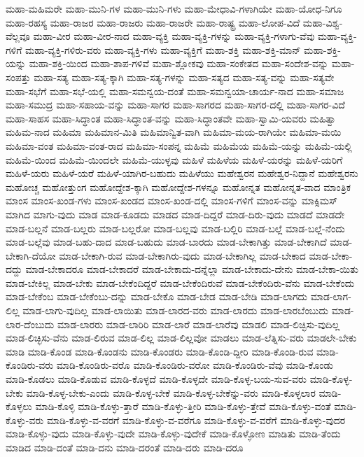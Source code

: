 {ಮಹಾ-ಮಹಿಮರೇ
ಮಹಾ-ಮುನಿ-ಗಳ
ಮಹಾ-ಮುನಿ-ಗಳು
ಮಹಾ-ಮೇಧಾವಿ-ಗಳಾಗಿಯೇ
ಮಹಾ-ಯೋಧ-ನಿಗೂ
ಮಹಾ-ರಹಸ್ಯ
ಮಹಾ-ರಾಜರ
ಮಹಾ-ರಾಜರು
ಮಹಾ-ರಾಜರೇ
ಮಹಾ-ರಾಷ್ಟ್ರ
ಮಹಾ-ಲೋಪ-ವಿದೆ
ಮಹಾ-ವಿಶ್ವ-ವೆಲ್ಲವೂ
ಮಹಾ-ವೀರ
ಮಹಾ-ವೀರ-ನಾದ
ಮಹಾ-ವ್ಯಕ್ತಿ
ಮಹಾ-ವ್ಯಕ್ತಿ-ಗಳನ್ನು
ಮಹಾ-ವ್ಯಕ್ತಿ-ಗಳಾಗು-ವೆವು
ಮಹಾ-ವ್ಯಕ್ತಿ-ಗಳಿಗೆ
ಮಹಾ-ವ್ಯಕ್ತಿ-ಗಳಿರು-ವರು
ಮಹಾ-ವ್ಯಕ್ತಿ-ಗಳು
ಮಹಾ-ವ್ಯಕ್ತಿಗೆ
ಮಹಾ-ಶಕ್ತಿ
ಮಹಾ-ಶಕ್ತಿ-ಮಾನ್
ಮಹಾ-ಶಕ್ತಿ-ಯನ್ನು
ಮಹಾ-ಶಕ್ತಿ-ಯಿಂದ
ಮಹಾ-ಶಾಪ-ಗಳಿವೆ
ಮಹಾ-ಶ್ಲೋಕವು
ಮಹಾ-ಸಂಕೇತದ
ಮಹಾ-ಸಂದೇಶ-ವನ್ನು
ಮಹಾ-ಸಂಪತ್ತು
ಮಹಾ-ಸತ್ಯ
ಮಹಾ-ಸತ್ಯ-ಕ್ಕಾಗಿ
ಮಹಾ-ಸತ್ಯ-ಗಳನ್ನು
ಮಹಾ-ಸತ್ಯದ
ಮಹಾ-ಸತ್ಯ-ವನ್ನು
ಮಹಾ-ಸತ್ಯವೇ
ಮಹಾ-ಸಭೆಗೆ
ಮಹಾ-ಸಭೆ-ಯಲ್ಲಿ
ಮಹಾ-ಸಮನ್ವಯ-ದಂತೆ
ಮಹಾ-ಸಮನ್ವಯಾ-ಚಾರ್ಯ-ನಾದ
ಮಹಾ-ಸಮಾಜ
ಮಹಾ-ಸಮುದ್ರ
ಮಹಾ-ಸಹಾಯ-ವನ್ನು
ಮಹಾ-ಸಾಗರ
ಮಹಾ-ಸಾಗರದ
ಮಹಾ-ಸಾಗರ-ದಲ್ಲಿ
ಮಹಾ-ಸಾಗರ-ವಿದೆ
ಮಹಾ-ಸಾಹಸ
ಮಹಾ-ಸಿದ್ಧಾಂತ
ಮಹಾ-ಸಿದ್ಧಾಂತ-ವನ್ನು
ಮಹಾ-ಸಿದ್ಧಾಂತವೇ
ಮಹಾ-ಸ್ವಾಮಿ-ಯವರು
ಮಹಿತ್ವಾ
ಮಹಿಮ-ನಾದ
ಮಹಿಮಾ
ಮಹಿಮಾನ-ಮಿತಿ
ಮಹಿಮಾನ್ವಿತ-ವಾಗಿ
ಮಹಿಮಾ-ಮಯ-ರಾಗಿಯೇ
ಮಹಿಮಾ-ಮಯಿ
ಮಹಿಮಾ-ವಂತ
ಮಹಿಮಾ-ವಂತ-ರಾದ
ಮಹಿಮಾ-ಸಂಪನ್ನ
ಮಹಿಮೆ
ಮಹಿಮೆಯ
ಮಹಿಮೆ-ಯನ್ನು
ಮಹಿಮೆ-ಯಲ್ಲಿ
ಮಹಿಮೆ-ಯಿಂದ
ಮಹಿಮೆ-ಯಿಂದಲೇ
ಮಹಿಮೆ-ಯುಳ್ಳವು
ಮಹಿಳೆ
ಮಹಿಳೆಯ
ಮಹಿಳೆ-ಯರನ್ನು
ಮಹಿಳೆ-ಯರಿಗೆ
ಮಹಿಳೆ-ಯರು
ಮಹಿಳೆ-ಯರೆ
ಮಹಿಳೆ-ಯಾಗಿರ-ಬಹುದು
ಮಹಿಳೆಯು
ಮಹೇಶ್ವರನ
ಮಹೇಶ್ವರ-ನಿದ್ದಾನೆ
ಮಹೇಶ್ವರನು
ಮಹೋಚ್ಚ
ಮಹೋತ್ತುಂಗ
ಮಹೋದ್ದೇಶ-ಕ್ಕಾಗಿ
ಮಹೋದ್ದೇಶ-ಗಳನ್ನೂ
ಮಹೋನ್ನತ
ಮಹೋನ್ನತ-ವಾದ
ಮಾಂತ್ರಿಕ
ಮಾಂಸ
ಮಾಂಸ-ಖಂಡ-ಗಳು
ಮಾಂಸ-ಖಂಡದ
ಮಾಂಸ-ಖಂಡ-ದಲ್ಲಿ
ಮಾಂಸ-ಗಳಿಗೆ
ಮಾಂಸ-ವನ್ನು
ಮಾಕ್ಸಿಮಸ್
ಮಾಗಿದ
ಮಾಗು-ವುದು
ಮಾಡ
ಮಾಡ-ಕೂಡದು
ಮಾಡದ
ಮಾಡ-ದಿದ್ದರೆ
ಮಾಡ-ದಿರು-ವುದು
ಮಾಡದೆ
ಮಾಡದೇ
ಮಾಡ-ಬಲ್ಲನೆ
ಮಾಡ-ಬಲ್ಲರು
ಮಾಡ-ಬಲ್ಲರೋ
ಮಾಡ-ಬಲ್ಲವು
ಮಾಡ-ಬಲ್ಲಿರಿ
ಮಾಡ-ಬಲ್ಲೆ
ಮಾಡ-ಬಲ್ಲೆ-ನೆಂದು
ಮಾಡ-ಬಲ್ಲೆವು
ಮಾಡ-ಬಹು-ದಾದ
ಮಾಡ-ಬಹುದು
ಮಾಡ-ಬಾರದು
ಮಾಡ-ಬೇಕಾಗಿತ್ತು
ಮಾಡ-ಬೇಕಾಗಿದೆ
ಮಾಡ-ಬೇಕಾಗಿ-ದೆಯೋ
ಮಾಡ-ಬೇಕಾಗಿ-ರುವ
ಮಾಡ-ಬೇಕಾಗಿರು-ವುದು
ಮಾಡ-ಬೇಕಾಗಿಲ್ಲ
ಮಾಡ-ಬೇಕಾದ
ಮಾಡ-ಬೇಕಾ-ದದ್ದು
ಮಾಡ-ಬೇಕಾದರೂ
ಮಾಡ-ಬೇಕಾದರೆ
ಮಾಡ-ಬೇಕಾದು-ದನ್ನೆಲ್ಲಾ
ಮಾಡ-ಬೇಕಾದು-ದೇನು
ಮಾಡ-ಬೇಕಾ-ಯಿತು
ಮಾಡ-ಬೇಕಿಲ್ಲ
ಮಾಡ-ಬೇಕು
ಮಾಡ-ಬೇಕೆಂದಿದ್ದರೆ
ಮಾಡ-ಬೇಕೆಂದಿರುವೆ
ಮಾಡ-ಬೇಕೆಂದಿರು-ವೆನು
ಮಾಡ-ಬೇಕೆಂದು
ಮಾಡ-ಬೇಕೆಂಬ
ಮಾಡ-ಬೇಕೆಂಬು-ದನ್ನು
ಮಾಡ-ಬೇಕೊ
ಮಾಡ-ಬೇಡ
ಮಾಡ-ಬೇಡಿ
ಮಾಡ-ಲಾಗದು
ಮಾಡ-ಲಾಗ-ಲಿಲ್ಲ
ಮಾಡ-ಲಾಗು-ವುದಿಲ್ಲ
ಮಾಡ-ಲಾಯಿತು
ಮಾಡ-ಲಾರದ-ವರು
ಮಾಡ-ಲಾರದು
ಮಾಡ-ಲಾರಬೆಂಬುದು
ಮಾಡ-ಲಾರ-ದೆಂಬುದು
ಮಾಡ-ಲಾರರು
ಮಾಡ-ಲಾರಿರಿ
ಮಾಡ-ಲಾರೆ
ಮಾಡ-ಲಾರೆವು
ಮಾಡಲಿ
ಮಾಡ-ಲಿಚ್ಛಿಸು-ವುದಿಲ್ಲ
ಮಾಡ-ಲಿಚ್ಛಿಸು-ವೆನು
ಮಾಡ-ಲಿರುವ
ಮಾಡ-ಲಿಲ್ಲ
ಮಾಡ-ಲಿಲ್ಲವೋ
ಮಾಡಲು
ಮಾಡ-ಲೆತ್ನಿಸು-ವರು
ಮಾಡಲೇ-ಬೇಕು
ಮಾಡಿ
ಮಾಡಿ-ಕೊಂಡ
ಮಾಡಿ-ಕೊಂಡನು
ಮಾಡಿ-ಕೊಂಡರು
ಮಾಡಿ-ಕೊಂಡಿ-ದ್ದೀರಿ
ಮಾಡಿ-ಕೊಂಡಿ-ರುವ
ಮಾಡಿ-ಕೊಂಡಿರು-ವರು
ಮಾಡಿ-ಕೊಂಡಿರು-ವರೊ
ಮಾಡಿ-ಕೊಂಡಿರು-ವರೋ
ಮಾಡಿ-ಕೊಂಡಿರು-ವೆವು
ಮಾಡಿ-ಕೊಂಡು
ಮಾಡಿ-ಕೊಡಲು
ಮಾಡಿ-ಕೊಡುವ
ಮಾಡಿ-ಕೊಳ್ಳದೆ
ಮಾಡಿ-ಕೊಳ್ಳದೇ
ಮಾಡಿ-ಕೊಳ್ಳ-ಬಯ-ಸುವ-ವರು
ಮಾಡಿ-ಕೊಳ್ಳ-ಬೇಕು
ಮಾಡಿ-ಕೊಳ್ಳ-ಬೇಕು-ಎಂದು
ಮಾಡಿ-ಕೊಳ್ಳ-ಬೇಕೆ
ಮಾಡಿ-ಕೊಳ್ಳ-ಬೇಕೆನ್ನು-ವರು
ಮಾಡಿ-ಕೊಳ್ಳಲಾರ
ಮಾಡಿ-ಕೊಳ್ಳಲು
ಮಾಡಿ-ಕೊಳ್ಳಿ
ಮಾಡಿ-ಕೊಳ್ಳು-ತ್ತಾರೆ
ಮಾಡಿ-ಕೊಳ್ಳು-ತ್ತೀರಿ
ಮಾಡಿ-ಕೊಳ್ಳು-ತ್ತೇವೆ
ಮಾಡಿ-ಕೊಳ್ಳು-ವಂತೆ
ಮಾಡಿ-ಕೊಳ್ಳು-ವರು
ಮಾಡಿ-ಕೊಳ್ಳು-ವ-ವರಗೆ
ಮಾಡಿ-ಕೊಳ್ಳು-ವ-ವರೆಗೂ
ಮಾಡಿ-ಕೊಳ್ಳು-ವ-ವರೆಗೆ
ಮಾಡಿ-ಕೊಳ್ಳು-ವುದರ
ಮಾಡಿ-ಕೊಳ್ಳು-ವುದು
ಮಾಡಿ-ಕೊಳ್ಳು-ವುದೇ
ಮಾಡಿ-ಕೊಳ್ಳು-ವುದೇಕೆ
ಮಾಡಿ-ಕೊಳ್ಳೋಣ
ಮಾಡಿತು
ಮಾಡಿ-ತೆಂದು
ಮಾಡಿದ
ಮಾಡಿ-ದಂತೆ
ಮಾಡಿ-ದನು
ಮಾಡಿ-ದರಂತೆ
ಮಾಡಿ-ದರು
ಮಾಡಿ-ದರೂ
}
